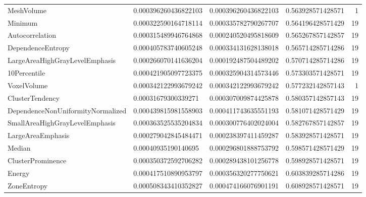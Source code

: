 {\begin{xltabular}[H]{\textwidth}{X l l l r}
    MeshVolume                             & \num{0.000396260436822103} & \num{0.000396260436822103} & \num{0.563928571428571} & 1\\
    Minimum                                & \num{0.000322590164718114} & \num{0.000335782790267707} & \num{0.564196428571429} & 19\\
    Autocorrelation                        & \num{0.000315489946764868} & \num{0.000240520495818609} & \num{0.565267857142857} & 19\\
    DependenceEntropy                      & \num{0.000405783740605248} & \num{0.000334131628138018} & \num{0.565714285714286} & 19\\
    LargeAreaHighGrayLevelEmphasis         & \num{0.000266070141636204} & \num{0.000192487504489202} & \num{0.570714285714286} & 19\\
    10Percentile                           & \num{0.000421905097723375} & \num{0.000325904314573446} & \num{0.573303571428571} & 19\\
    VoxelVolume                            & \num{0.000342122993679242} & \num{0.000342122993679242} & \num{0.577232142857143} & 1\\
    ClusterTendency                        & \num{0.00031679300339271}  & \num{0.000307009874425878} & \num{0.580357142857143} & 19\\
    DependenceNonUniformityNormalized      & \num{0.000439815981558903} & \num{0.000411743635551193} & \num{0.581071428571429} & 19\\
    SmallAreaHighGrayLevelEmphasis         & \num{0.000363525535204834} & \num{0.000300776402024004} & \num{0.582767857142857} & 19\\
    LargeAreaEmphasis                      & \num{0.000279042845484471} & \num{0.000238397411459287} & \num{0.583928571428571} & 19\\
    Median                                 & \num{0.00040935190140695}  & \num{0.000296801888753792} & \num{0.598571428571429} & 19\\
    ClusterProminence                      & \num{0.000350372592706282} & \num{0.000289438101256778} & \num{0.598928571428571} & 19\\
    Energy                                 & \num{0.000417510890953797} & \num{0.000356320277750621} & \num{0.603839285714286} & 19\\
    ZoneEntropy                            & \num{0.000508343410352827} & \num{0.000474166076901191} & \num{0.608928571428571} & 19\\

\end{xltabular}}
